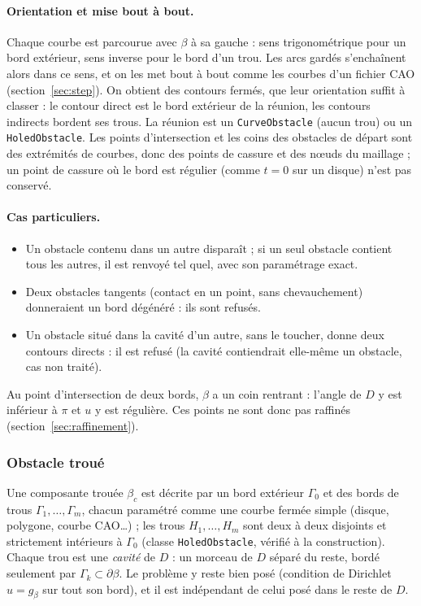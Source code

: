 \documentclass[11pt,a4paper]{article}
\begin{document}
\paragraph{Orientation et mise bout à bout.} Chaque courbe est parcourue avec
$\beta$ à sa gauche : sens trigonométrique pour un bord extérieur, sens
inverse pour le bord d'un trou. Les arcs gardés s'enchaînent alors dans ce
sens, et on les met bout à bout comme les courbes d'un fichier CAO
(section~\ref{sec:step}). On obtient des contours fermés, que leur
orientation suffit à classer : le contour direct est le bord extérieur de
la réunion, les contours indirects bordent ses trous. La réunion est un
\texttt{CurveObstacle} (aucun trou) ou un \texttt{HoledObstacle}. Les points
d'intersection et les coins des obstacles de départ sont des extrémités de
courbes, donc des points de cassure et des nœuds du maillage ; un point de
cassure où le bord est régulier (comme $t = 0$ sur un disque) n'est pas
conservé.

\paragraph{Cas particuliers.}
\begin{itemize}
  \item Un obstacle contenu dans un autre disparaît ; si un seul obstacle
        contient tous les autres, il est renvoyé tel quel, avec son
        paramétrage exact.
  \item Deux obstacles tangents (contact en un point, sans chevauchement)
        donneraient un bord dégénéré : ils sont refusés.
  \item Un obstacle situé dans la cavité d'un autre, sans le toucher, donne
        deux contours directs : il est refusé (la cavité contiendrait
        elle-même un obstacle, cas non traité).
\end{itemize}

Au point d'intersection de deux bords, $\beta$ a un coin rentrant :
l'angle de $D$ y est inférieur à $\pi$ et $u$ y est régulière. Ces points
ne sont donc pas raffinés (section~\ref{sec:raffinement}).

\subsubsection*{Obstacle troué}
\label{sec:troue}

Une composante trouée $\beta_c$ est décrite par un bord extérieur
$\Gamma_0$ et des bords de trous $\Gamma_1, \dots, \Gamma_m$, chacun
paramétré comme une courbe fermée simple (disque, polygone, courbe CAO\dots) ;
les trous $H_1, \dots, H_m$ sont deux à deux disjoints et strictement
intérieurs à $\Gamma_0$ (classe \texttt{HoledObstacle}, vérifié à la
construction). Chaque trou est une \emph{cavité} de $D$ : un morceau de $D$
séparé du reste, bordé seulement par $\Gamma_k \subset \partial\beta$. Le
problème y reste bien posé (condition de Dirichlet $u = g_\beta$ sur tout
son bord), et il est indépendant de celui posé dans le reste de $D$.
\end{document}
